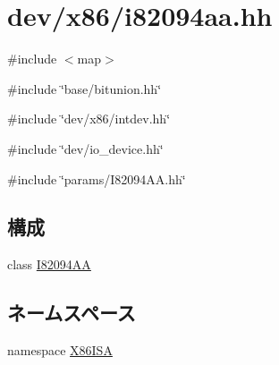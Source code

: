 \hypertarget{i82094aa_8hh}{
\section{dev/x86/i82094aa.hh}
\label{i82094aa_8hh}
}
{\ttfamily \#include $<$map$>$}\par
{\ttfamily \#include \char`\"{}base/bitunion.hh\char`\"{}}\par
{\ttfamily \#include \char`\"{}dev/x86/intdev.hh\char`\"{}}\par
{\ttfamily \#include \char`\"{}dev/io\_\-device.hh\char`\"{}}\par
{\ttfamily \#include \char`\"{}params/I82094AA.hh\char`\"{}}\par
\subsection*{構成}
\begin{DoxyCompactItemize}
\item 
class \hyperlink{classX86ISA_1_1I82094AA}{I82094AA}
\end{DoxyCompactItemize}
\subsection*{ネームスペース}
\begin{DoxyCompactItemize}
\item 
namespace \hyperlink{namespaceX86ISA}{X86ISA}
\end{DoxyCompactItemize}
